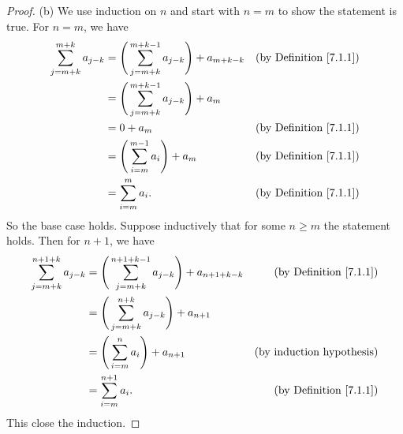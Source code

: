 \begin{proof}{(b)}
We use induction on \(n\) and start with \(n = m\) to show the statement is true.
For \(n = m\), we have
\begin{align*}
\sum_{j = m + k}^{m + k} a_{j - k} &= \Bigg(\sum_{j = m + k}^{m + k - 1} a_{j - k}\Bigg) + a_{m + k - k} & \text{(by Definition \ref{7.1.1})} \\
&= \Bigg(\sum_{j = m + k}^{m + k - 1} a_{j - k}\Bigg) + a_m \\
&= 0 + a_m & \text{(by Definition \ref{7.1.1})} \\
&= \Bigg(\sum_{i = m}^{m - 1} a_i\Bigg) + a_m & \text{(by Definition \ref{7.1.1})} \\
&= \sum_{i = m}^m a_i. & \text{(by Definition \ref{7.1.1})}
\end{align*}
So the base case holds.
Suppose inductively that for some \(n \geq m\) the statement holds.
Then for \(n + 1\), we have
\begin{align*}
\sum_{j = m + k}^{n + 1 + k} a_{j - k} &= \Bigg(\sum_{j = m + k}^{n + 1 + k - 1} a_{j - k}\Bigg) + a_{n + 1 + k - k} & \text{(by Definition \ref{7.1.1})} \\
&= \Bigg(\sum_{j = m + k}^{n + k} a_{j - k}\Bigg) + a_{n + 1} \\
&= \Bigg(\sum_{i = m}^n a_i\Bigg) + a_{n + 1} & \text{(by induction hypothesis)} \\
&= \sum_{i = m}^{n + 1} a_i. & \text{(by Definition \ref{7.1.1})}
\end{align*}
This close the induction.
\end{proof}

